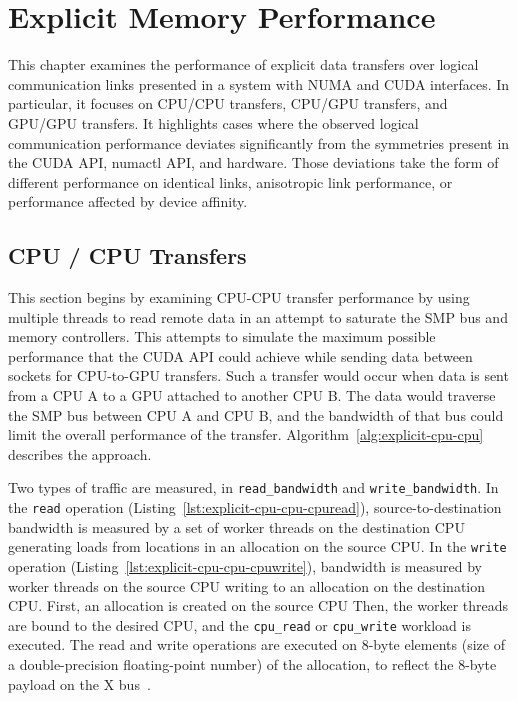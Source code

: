 \chapter{Explicit Memory Performance}
\label{ch:explicit}

This chapter examines the performance of explicit data transfers over logical communication links presented in a system with NUMA and CUDA interfaces.
In particular, it focuses on CPU/CPU transfers, CPU/GPU transfers, and GPU/GPU transfers.
It highlights cases where the observed logical communication performance deviates significantly from the symmetries present in the CUDA API, numactl API, and hardware.
Those deviations take the form of different performance on identical links, anisotropic link performance, or performance affected by device affinity.

\section{CPU / CPU Transfers}
\label{sec:explicit-cpu-cpu}

This section begins by examining CPU-CPU transfer performance by using multiple threads to read remote data in an attempt to saturate the SMP bus and memory controllers.
This attempts to simulate the maximum possible performance that the CUDA API could achieve while sending data between sockets for CPU-to-GPU transfers.
Such a transfer would occur when data is sent from a CPU A to a GPU attached to another CPU B.
The data would traverse the SMP bus between CPU A and CPU B, and the bandwidth of that bus could limit the overall performance of the transfer.
Algorithm~\ref{alg:explicit-cpu-cpu} describes the approach.

Two types of traffic are measured, in \texttt{read\_bandwidth} and \texttt{write\_bandwidth}.
In the \texttt{read} operation (Listing~\ref{lst:explicit-cpu-cpu-cpuread}), source-to-destination bandwidth is measured by a set of worker threads on the destination CPU generating loads from locations in an allocation on the source CPU.
In the \texttt{write} operation (Listing~\ref{lst:explicit-cpu-cpu-cpuwrite}), bandwidth is measured by worker threads on the source CPU writing to an allocation on the destination CPU.
First, an allocation is created on the source CPU
Then, the worker threads are bound to the desired CPU, and the \texttt{cpu\_read} or \texttt{cpu\_write} workload is executed.
The read and write operations are executed on 8-byte elements (size of a double-precision floating-point number) of the allocation, to reflect the 8-byte payload on the X bus~\cite{caldeira2016s822lc}.

